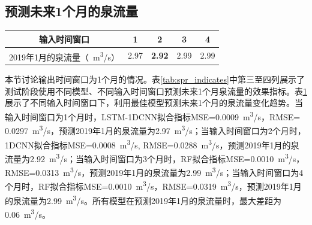 {\begin{longtable}{clcccccccc}
  \end{longtable}
}

\subsection{预测未来1个月的泉流量}\label{sec:spr_one}

\begin{table}[!htbp]
  \centering
  \label{tab:spr_one}
  \footnotesize
  \begin{tabular}{ccccc}
    \toprule
    输入时间窗口 & 1 & 2 & 3 & 4\\
    \midrule
    2019年1月的泉流量（\SI{}{m^{3}/s}）& 2.97 & \textbf{2.92} & 2.99 & 2.99 \\
    \bottomrule
  \end{tabular}
\end{table}

本节讨论输出时间窗口为1个月的情况。表\ref{tab:spr_indicates}中第三至四列展示了测试阶段使用不同模型、不同输入时间窗口预测未来1个月泉流量的效果指标。表\ref{tab:spr_one}展示了不同输入时间窗口下，利用最佳模型预测未来1个月的泉流量变化趋势。当输入时间窗口为1个月时，LSTM-1DCNN拟合指标MSE=\SI{0.0009}{m^{3}/s}，RMSE=\\\SI{0.0297}{m^{3}/s}，预测2019年1月的泉流量为\SI{2.97}{m^{3}/s}；当输入时间窗口为2个月时，1DCNN拟合指标MSE=\SI{0.0008}{m^{3}/s}, RMSE=\SI{0.0288}{m^{3}/s}，预测2019年1月的泉流量为\SI{2.92}{m^{3}/s}；当输入时间窗口为3个月时，RF拟合指标MSE=\SI{0.0010}{m^{3}/s}，RMSE=\SI{0.0313}{m^{3}/s}，预测2019年1月的泉流量为\SI{2.99}{m^{3}/s}；当输入时间窗口为4个月时，RF拟合指标MSE=\SI{0.0010}{m^{3}/s}，RMSE=\SI{0.0319}{m^{3}/s}，预测2019年1月的泉流量为\SI{2.99}{m^{3}/s}。所有模型在预测2019年1月的泉流量时，最大差距为\SI{0.06}{m^{3}/s}。

